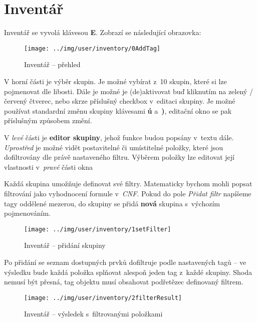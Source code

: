 
\section{Inventář}

Inventář se vyvolá klávesou \textbf{E}. Zobrazí se následující obrazovka:

\begin{figure}[!ht]\centering
\texttt{[image: ../img/user/inventory/0AddTag]}

\caption{Inventář -- přehled}
\label{fig:user_inventory_0AddTag}

\end{figure}

\FloatBarrier

V horní části je výběr skupin. Je možné vybírat z~10 skupin, které si lze pojmenovat dle libosti. Dále je možné je (de)aktivovat buď kliknutím na zelený / červený čtverec, nebo skrze příslušný checkbox v~editaci skupiny.
Je možné používat standardní změnu skupiny klávesami \textbf{ú} a~\textbf{)}, editační okno se pak příslušným způsobem změní. 

V \textit{levé} části je \textbf{editor skupiny}, jehož funkce budou popsány v~textu dále. \textit{Uprostřed} je možné vidět postavitelné či umístitelné položky, které jsou dofiltrovány dle právě nastaveného filtru. Výběrem položky lze editovat její vlastnosti v~\textit{pravé} části okna

\FloatBarrier

Každá skupina umožňuje definovat své filtry. Matematicky bychom mohli popsat filtrování jako vyhodnocení formule v~\textit{CNF}. Pokud do pole \textit{Přidat filtr} napíšeme tagy oddělené mezerou, do skupiny se přidá \textbf{nová} skupina s~výchozím pojmenováním.

\begin{figure}[!ht]\centering
\texttt{[image: ../img/user/inventory/1setFilter]}

\caption{Inventář -- přidání skupiny}
\label{fig:user_inventory_1setFilter}

\end{figure}

\FloatBarrier

Po přidání se seznam dostupných prvků dofiltruje podle nastavených tagů -- ve výsledku bude každá položka splňovat alespoň jeden tag z~každé skupiny. Shoda nemusí být přesná, tag objektu musí obsahovat podřetězec definovaný filtrem.
\begin{figure}[!ht]\centering
\texttt{[image: ../img/user/inventory/2filterResult]}

\caption{Inventář -- výsledek s~filtrovanými položkami}
\label{fig:user_inventory_2filterResult}

\end{figure}

